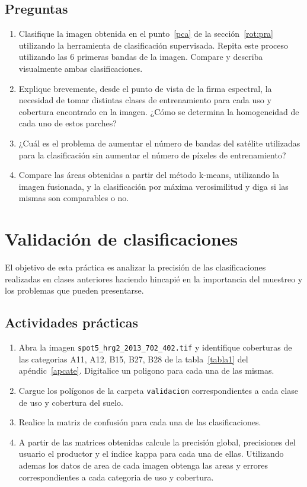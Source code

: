 \documentclass[hidelinks,12pt]{article}
\begin{document}
\subsection{Preguntas}
\begin{enumerate}
    \item Clasifique la imagen obtenida en el punto~\ref{pca} de la secci\'on~\ref{rot:pra}
        utilizando la herramienta de clasificación supervisada.
        Repita este proceso utilizando las 6 primeras bandas de la imagen. 
        Compare y describa visualmente ambas clasificaciones.
    \item Explique brevemente, desde el punto de vista de la firma espectral, la
        necesidad de tomar distintas clases de entrenamiento para cada uso y
        cobertura encontrado en la imagen. ¿Cómo se determina la homogeneidad de
        cada uno de estos parches?
    \item ¿Cuál es el problema de aumentar el número de bandas del satélite
        utilizadas para la clasificación sin aumentar el número de píxeles de
        entrenamiento?
    \item Compare las áreas obtenidas a partir del método k-means, utilizando la
        imagen fusionada, y la clasificación por máxima verosimilitud y diga si
        las mismas son comparables o no.
\end{enumerate}

\newpage
\section{Validación de clasificaciones}
El objetivo de esta práctica es analizar la precisión de las clasificaciones
realizadas en clases anteriores haciendo hincapié en la importancia del muestreo
y los problemas que pueden presentarse. 

\subsection{Actividades pr\'acticas}
\begin{enumerate}
    \item Abra la imagen \texttt{spot5\_hrg2\_2013\_702\_402.tif} y
        identifique coberturas de las categorias A11, A12, B15, B27, B28 de la 
        tabla~\ref{tabla1} del ap\'endic~\ref{apcate}. Digitalice un poligono
        para cada una de las mismas.
    \item Cargue los polígonos de la carpeta \texttt{validacion} correspondientes a cada clase de
        uso y cobertura del suelo. 
    \item Realice la matriz de confusión para cada una de las clasificaciones.
    \item A partir de las matrices obtenidas calcule la precisión global,
        precisiones del usuario el productor y el índice kappa para cada una de
        ellas. Utilizando ademas los datos de area de cada imagen obtenga las
        areas y errores correspondientes a cada categoria de uso y cobertura.
\end{enumerate}
\end{document}
